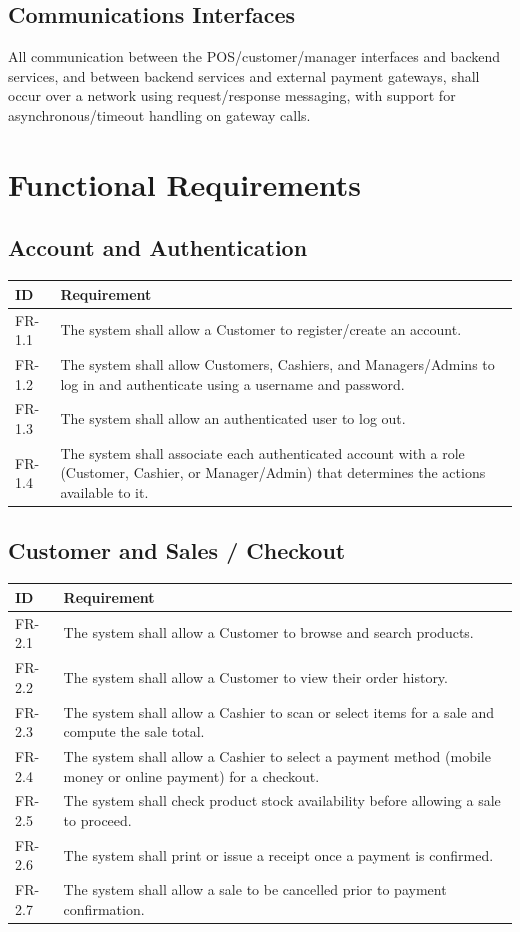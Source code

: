 \documentclass[11pt,a4paper]{report}
\begin{document}
\subsection{Communications Interfaces}
All communication between the POS/customer/manager interfaces and backend services, and between backend services and external payment gateways, shall occur over a network using request/response messaging, with support for asynchronous/timeout handling on gateway calls.

\section{Functional Requirements}

\subsection{Account and Authentication}
\begin{longtable}{p{1.6cm} L{11.4cm}}
\toprule
\textbf{ID} & \textbf{Requirement} \\
\midrule
\endhead
FR-1.1 & The system shall allow a Customer to register/create an account. \\
FR-1.2 & The system shall allow Customers, Cashiers, and Managers/Admins to log in and authenticate using a username and password. \\
FR-1.3 & The system shall allow an authenticated user to log out. \\
FR-1.4 & The system shall associate each authenticated account with a role (Customer, Cashier, or Manager/Admin) that determines the actions available to it. \\
\bottomrule
\end{longtable}

\subsection{Customer and Sales / Checkout}
\begin{longtable}{p{1.6cm} L{11.4cm}}
\toprule
\textbf{ID} & \textbf{Requirement} \\
\midrule
\endhead
FR-2.1 & The system shall allow a Customer to browse and search products. \\
FR-2.2 & The system shall allow a Customer to view their order history. \\
FR-2.3 & The system shall allow a Cashier to scan or select items for a sale and compute the sale total. \\
FR-2.4 & The system shall allow a Cashier to select a payment method (mobile money or online payment) for a checkout. \\
FR-2.5 & The system shall check product stock availability before allowing a sale to proceed. \\
FR-2.6 & The system shall print or issue a receipt once a payment is confirmed. \\
FR-2.7 & The system shall allow a sale to be cancelled prior to payment confirmation. \\
\bottomrule
\end{longtable}
\end{document}
